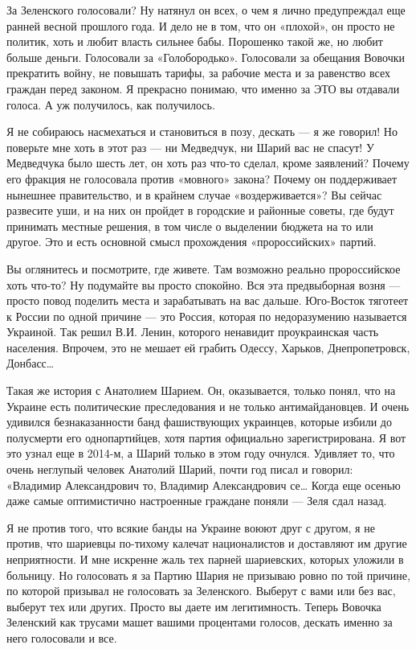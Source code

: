 За Зеленского голосовали? Ну натянул он всех, о чем я лично предупреждал еще
ранней весной прошлого года. И дело не в том, что он «плохой», он просто не
политик, хоть и любит власть сильнее бабы. Порошенко такой же, но любит больше
деньги. Голосовали за «Голобородько». Голосовали за обещания Вовочки прекратить
войну, не повышать тарифы, за рабочие места и за равенство всех граждан перед
законом. Я прекрасно понимаю, что именно за ЭТО вы отдавали голоса. А уж
получилось, как получилось.

Я не собираюсь насмехаться и становиться в позу, дескать --- я же говорил! Но
поверьте мне хоть в этот раз --- ни Медведчук, ни Шарий вас не спасут! У
Медведчука было шесть лет, он хоть раз что-то сделал, кроме заявлений? Почему
его фракция не голосовала против «мовного» закона? Почему он поддерживает
нынешнее правительство, и в крайнем случае «воздерживается»? Вы сейчас
развесите уши, и на них он пройдет в городские и районные советы, где будут
принимать местные решения, в том числе о выделении бюджета на то или другое.
Это и есть основной смысл прохождения «пророссийских» партий.

Вы оглянитесь и посмотрите, где живете. Там возможно реально пророссийское хоть
что-то? Ну подумайте вы просто спокойно. Вся эта предвыборная возня --- просто
повод поделить места и зарабатывать на вас дальше. Юго-Восток тяготеет к России
по одной причине --- это Россия, которая по недоразумению называется Украиной.
Так решил В.И. Ленин, которого ненавидит проукраинская часть населения.
Впрочем, это не мешает ей грабить Одессу, Харьков, Днепропетровск, Донбасс…

Такая же история с Анатолием Шарием. Он, оказывается, только понял, что на
Украине есть политические преследования и не только антимайдановцев. И очень
удивился безнаказанности банд фашиствующих украинцев, которые избили до
полусмерти его однопартийцев, хотя партия официально зарегистрирована. Я вот
это узнал еще в 2014-м, а Шарий только в этом году очнулся. Удивляет то, что
очень неглупый человек Анатолий Шарий, почти год писал и говорил: «Владимир
Александрович то, Владимир Александрович се… Когда еще осенью даже самые
оптимистично настроенные граждане поняли --- Зеля сдал назад.

Я не против того, что всякие банды на Украине воюют друг с другом, я не против,
что шариевцы по-тихому калечат националистов и доставляют им другие
неприятности. И мне искренне жаль тех парней шариевских, которых уложили в
больницу. Но голосовать я за Партию Шария не призываю ровно по той причине, по
которой призывал не голосовать за Зеленского. Выберут с вами или без вас,
выберут тех или других. Просто вы даете им легитимность. Теперь Вовочка
Зеленский как трусами машет вашими процентами голосов, дескать именно за него
голосовали и все.

